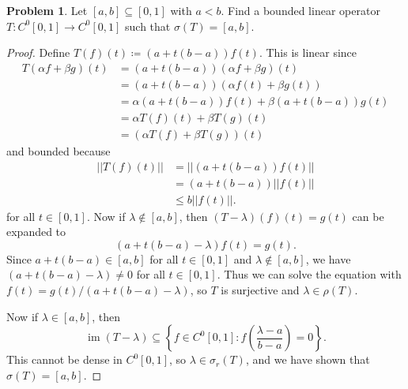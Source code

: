\documentclass[12pt]{article}
\DeclareMathOperator{\im}{im}
\theoremstyle{definition}
\newtheorem{ex}{Problem}
\begin{document}
\begin{ex}
	Let $[a, b] \subseteq [0,1]$ with $a < b$.
	Find a bounded linear operator $T : C^0[0, 1] \to C^0[0, 1]$ such that $\sigma(T) = [a, b]$.
\end{ex}
\begin{proof}
	Define $T(f)(t) \coloneq (a+t(b-a))f(t)$.
	This is linear since \begin{align*}
		T(\alpha f + \beta g)(t) & = (a + t(b-a))(\alpha f + \beta g)(t)            \\
		                         & = (a + t(b-a))(\alpha f(t) + \beta g(t))         \\
		                         & = \alpha(a + t(b-a))f(t) + \beta(a + t(b-a))g(t) \\
		                         & = \alpha T(f)(t) + \beta T(g)(t)                 \\
		                         & = (\alpha T(f) + \beta T(g))(t)
	\end{align*}
	and bounded because \begin{align*}
		||T(f)(t)|| & = ||(a + t(b-a))f(t)|| \\
		            & = (a+ t(b-a))||f(t)||  \\
		            & \leq b||f(t)||.
	\end{align*}
	for all $t \in [0, 1]$.
	Now if $\lambda \notin [a, b]$, then $(T-\lambda)(f)(t) = g(t)$ can be expanded to \begin{equation*}
		(a + t(b-a) - \lambda)f(t) = g(t).
	\end{equation*}
	Since $a + t(b-a) \in [a, b]$ for all $t \in [0, 1]$ and $\lambda \notin [a, b]$, we have $(a + t(b-a) - \lambda) \neq 0$ for all $t \in [0, 1]$.
	Thus we can solve the equation with $f(t) = g(t)/(a + t(b-a) - \lambda)$, so $T$ is surjective and $\lambda \in \rho(T)$.

	Now if $\lambda \in [a, b]$, then \begin{equation*}
		\im(T - \lambda) \subseteq \left\lbrace f \in C^0[0, 1] : f\left( \frac{\lambda - a}{b - a} \right) = 0 \right\rbrace.
	\end{equation*}
	This cannot be dense in $C^0[0, 1]$, so $\lambda \in \sigma_r(T)$, and we have shown that $\sigma(T) = [a, b]$.
\end{proof}
\end{document}
